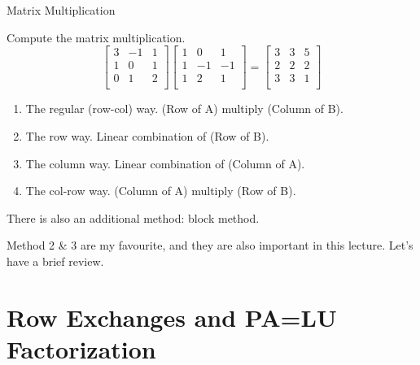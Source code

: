 \documentclass{beamer}
\begin{document}
\begin{frame}{Matrix Multiplication}
\begin{examples}
Compute the matrix multiplication.
    \begin{equation*}
        \left[ \begin{matrix}
            3&		-1&       1\\
            1&		 0&       1\\
            0&		 1&       2\\
        \end{matrix} \right] \left[ \begin{matrix}
            1&		 0&       1\\
            1&		-1&      -1\\
            1&		 2&       1\\
        \end{matrix} \right] =\left[ \begin{matrix}
            3&		 3&       5\\
            2&		 2&       2\\
            3&		 3&       1\\
        \end{matrix} \right]
    \end{equation*}
\end{examples}

\begin{enumerate}
    \item The regular (row-col) way. (Row of A) multiply (Column of B).
    \item The row way. Linear combination of (Row of B).
    \item The column way. Linear combination of (Column of A).
    \item The col-row way. (Column of A) multiply (Row of B).
\end{enumerate}

There is also an additional method: block method.

\vspace{3pt}
Method 2 \& 3 are my favourite, and they are also important in this lecture. Let's have a brief review.
\end{frame}


\section{Row Exchanges and PA=LU Factorization}
\end{document}
